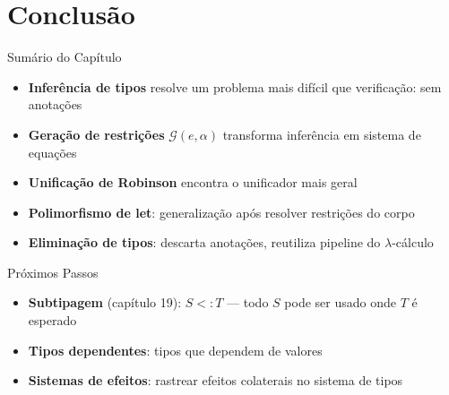 \section{Conclusão}\label{conclusuxe3o}

\begin{frame}{Sumário do Capítulo}

    \begin{itemize}

        \item
        \textbf{Inferência de tipos} resolve um problema mais difícil que
        verificação: sem anotações
        \item
        \textbf{Geração de restrições} \(\mathcal{G}(e, \alpha)\) transforma
        inferência em sistema de equações
        \item
        \textbf{Unificação de Robinson} encontra o unificador mais geral
        \item
        \textbf{Polimorfismo de let}: generalização após resolver restrições
        do corpo
        \item
        \textbf{Eliminação de tipos}: descarta anotações, reutiliza pipeline
        do \(\lambda\)-cálculo
    \end{itemize}
\end{frame}

\begin{frame}{Próximos Passos}

    \begin{itemize}

        \item
        \textbf{Subtipagem} (capítulo 19): \(S <: T\) --- todo \(S\) pode ser
        usado onde \(T\) é esperado
        \item
        \textbf{Tipos dependentes}: tipos que dependem de valores
        \item
        \textbf{Sistemas de efeitos}: rastrear efeitos colaterais no sistema
        de tipos
    \end{itemize}
\end{frame}
